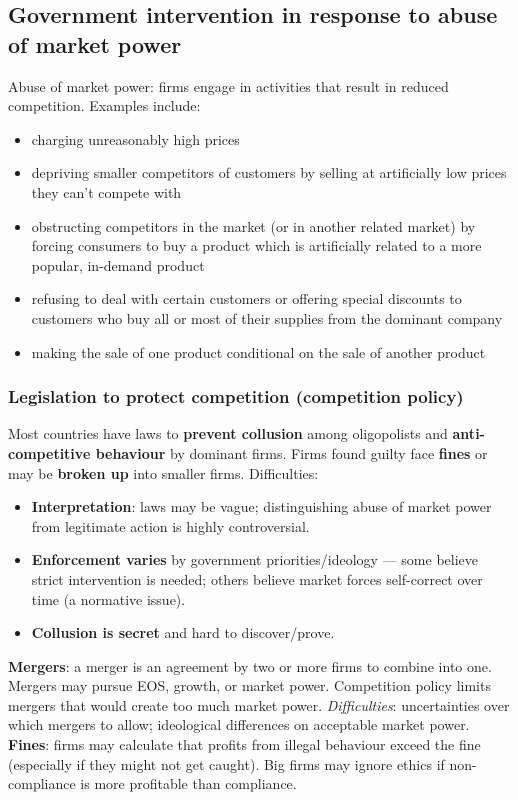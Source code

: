 \documentclass[a4paper,12pt]{article}
\begin{document}
\subsection{Government intervention in response to abuse of market power}
Abuse of market power: firms engage in activities that result in reduced competition. Examples include:
\begin{itemize}
  \item charging unreasonably high prices
  \item depriving smaller competitors of customers by selling at artificially low prices they can't compete with
  \item obstructing competitors in the market (or in another related market) by forcing consumers to buy a product which is artificially related to a more popular, in-demand product
  \item refusing to deal with certain customers or offering special discounts to customers who buy all or most of their supplies from the dominant company
  \item making the sale of one product conditional on the sale of another product
\end{itemize}
\subsubsection*{Legislation to protect competition (competition policy)}
Most countries have laws to \textbf{prevent collusion} among oligopolists and \textbf{anti-competitive behaviour} by dominant firms. Firms found guilty face \textbf{fines} or may be \textbf{broken up} into smaller firms. Difficulties:
\begin{itemize}
  \item \textbf{Interpretation}: laws may be vague; distinguishing abuse of market power from legitimate action is highly controversial.
  \item \textbf{Enforcement varies} by government priorities/ideology --- some believe strict intervention is needed; others believe market forces self-correct over time (a normative issue).
  \item \textbf{Collusion is secret} and hard to discover/prove.
\end{itemize}
\textbf{Mergers}: a merger is an agreement by two or more firms to combine into one. Mergers may pursue EOS, growth, or market power. Competition policy limits mergers that would create too much market power. \textit{Difficulties}: uncertainties over which mergers to allow; ideological differences on acceptable market power.
\\
\textbf{Fines}: firms may calculate that profits from illegal behaviour exceed the fine (especially if they might not get caught). Big firms may ignore ethics if non-compliance is more profitable than compliance.
\end{document}
